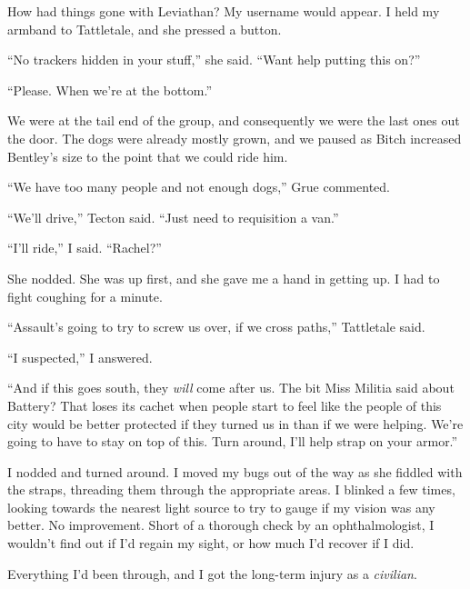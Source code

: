 How had things gone with Leviathan?  My username would appear.  I held my armband to Tattletale, and she pressed a button.



``No trackers hidden in your stuff,'' she said.  ``Want help putting this on?''



``Please.  When we're at the bottom.''



We were at the tail end of the group, and consequently we were the last ones out the door.  The dogs were already mostly grown, and we paused as Bitch increased Bentley's size to the point that we could ride him.



``We have too many people and not enough dogs,'' Grue commented.



``We'll drive,'' Tecton said.  ``Just need to requisition a van.''



``I'll ride,'' I said.  ``Rachel?''



She nodded.  She was up first, and she gave me a hand in getting up.  I had to fight coughing for a minute.



``Assault's going to try to screw us over, if we cross paths,'' Tattletale said.



``I suspected,'' I answered.



``And if this goes south, they \emph{will} come after us.  The bit Miss Militia said about Battery?  That loses its cachet when people start to feel like the people of this city would be better protected if they turned us in than if we were helping.  We're going to have to stay on top of this.  Turn around, I'll help strap on your armor.''



I nodded and turned around.  I moved my bugs out of the way as she fiddled with the straps, threading them through the appropriate areas.  I blinked a few times, looking towards the nearest light source to try to gauge if my vision was any better.  No improvement.  Short of a thorough check by an ophthalmologist, I wouldn't find out if I'd regain my sight, or how much I'd recover if I did.



Everything I'd been through, and I got the long-term injury as a \emph{civilian}.



